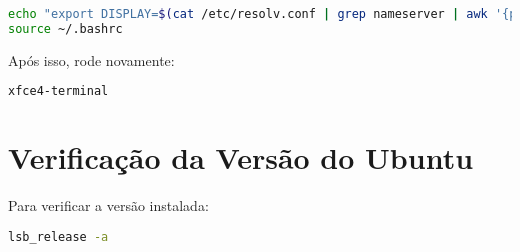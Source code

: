 \documentclass[12pt,a4paper]{article}
\begin{document}
\begin{lstlisting}[language=bash]
echo "export DISPLAY=$(cat /etc/resolv.conf | grep nameserver | awk '{print $2}'):0" >> ~/.bashrc
source ~/.bashrc
\end{lstlisting}

Após isso, rode novamente:

\begin{lstlisting}[language=bash]
xfce4-terminal
\end{lstlisting}

\section{Verificação da Versão do Ubuntu}

Para verificar a versão instalada:

\begin{lstlisting}[language=bash]
lsb_release -a
\end{lstlisting}
\end{document}

